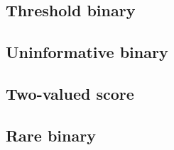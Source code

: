 \subsection{Threshold binary}
\begin{table}[h]
\centering\caption{Threshold binary, $n=200$, $N=2000$.}
\resizebox{\linewidth}{!}{}
\end{table}
\begin{table}[h]
\centering\caption{Threshold binary, $n=800$, $N=8000$.}
\resizebox{\linewidth}{!}{}
\end{table}
\clearpage
\subsection{Uninformative binary}
\begin{table}[h]
\centering\caption{Uninformative binary, $n=200$, $N=2000$.}
\resizebox{\linewidth}{!}{}
\end{table}
\begin{table}[h]
\centering\caption{Uninformative binary, $n=800$, $N=8000$.}
\resizebox{\linewidth}{!}{}
\end{table}
\clearpage
\subsection{Two-valued score}
\begin{table}[h]
\centering\caption{Two-valued score, $n=200$, $N=2000$.}
\resizebox{\linewidth}{!}{}
\end{table}
\begin{table}[h]
\centering\caption{Two-valued score, $n=800$, $N=8000$.}
\resizebox{\linewidth}{!}{}
\end{table}
\clearpage
\subsection{Rare binary}
\begin{table}[h]
\centering\caption{Rare binary, $n=200$, $N=2000$.}
\resizebox{\linewidth}{!}{}
\end{table}
\begin{table}[h]
\centering\caption{Rare binary, $n=800$, $N=8000$.}
\resizebox{\linewidth}{!}{}
\end{table}
\clearpage
